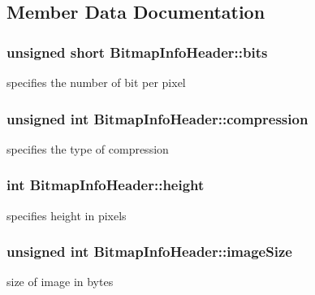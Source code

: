 \subsection{Member Data Documentation}
\subsubsection[{\texorpdfstring{bits}{bits}}]{\setlength{\rightskip}{0pt plus 5cm}unsigned short Bitmap\+Info\+Header\+::bits}\hypertarget{structBitmapInfoHeader_a1eebafc33573852f62a2e3d8adc25349}{}\label{structBitmapInfoHeader_a1eebafc33573852f62a2e3d8adc25349}
specifies the number of bit per pixel 
\subsubsection[{\texorpdfstring{compression}{compression}}]{\setlength{\rightskip}{0pt plus 5cm}unsigned int Bitmap\+Info\+Header\+::compression}\hypertarget{structBitmapInfoHeader_a87fb38b0fe68db4bed899b9733d1b7e9}{}\label{structBitmapInfoHeader_a87fb38b0fe68db4bed899b9733d1b7e9}
specifies the type of compression 
\subsubsection[{\texorpdfstring{height}{height}}]{\setlength{\rightskip}{0pt plus 5cm}int Bitmap\+Info\+Header\+::height}\hypertarget{structBitmapInfoHeader_aaa1d31efc13210020a38d435e4961df9}{}\label{structBitmapInfoHeader_aaa1d31efc13210020a38d435e4961df9}
specifies height in pixels 
\subsubsection[{\texorpdfstring{image\+Size}{imageSize}}]{\setlength{\rightskip}{0pt plus 5cm}unsigned int Bitmap\+Info\+Header\+::image\+Size}\hypertarget{structBitmapInfoHeader_a79bc984a7fd1c0f00ede6aa09143939f}{}\label{structBitmapInfoHeader_a79bc984a7fd1c0f00ede6aa09143939f}
size of image in bytes 
